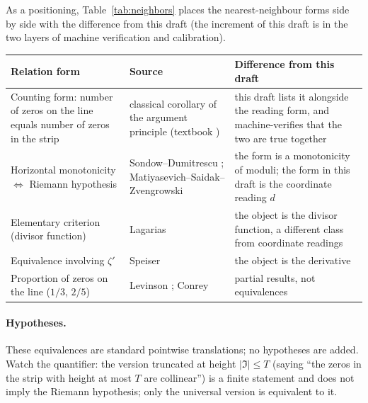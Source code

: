 \documentclass{article}
\renewcommand{\_}{\underscoreOrig\allowbreak}
\newcommand{\zt}{\zeta}
\begin{document}
As a positioning, Table~\ref{tab:neighbors} places the nearest-neighbour
forms side by side with the difference from this draft (the increment of
this draft is in the two layers of machine verification and calibration).

\begin{center}
\begin{tabular}{@{}>{\raggedright\arraybackslash}p{}@{\quad}>{\raggedright\arraybackslash}p{}>{\raggedright\arraybackslash}p{}@{}}
\hline
Relation form & Source & Difference from this draft \\
\hline
Counting form: number of zeros on the line equals number of zeros in the strip & classical corollary of the argument principle (textbook \cite{titchmarsh}) & this draft lists it alongside the reading form, and machine-verifies that the two are true together \\
Horizontal monotonicity $\Leftrightarrow$ Riemann hypothesis & Sondow--Dumitrescu \cite{sondow2010}; Matiyasevich--Saidak--Zvengrowski \cite{msz2014} & the form is a monotonicity of moduli; the form in this draft is the coordinate reading $d$ \\
Elementary criterion (divisor function) & Lagarias \cite{lagarias2002} & the object is the divisor function, a different class from coordinate readings \\
Equivalence involving $\zt'$ & Speiser \cite{speiser} & the object is the derivative \\
Proportion of zeros on the line ($1/3$, $2/5$) & Levinson \cite{levinson1974}; Conrey \cite{conrey1989} & partial results, not equivalences \\
\hline
\end{tabular}
\end{center}
\label{tab:neighbors}
\vspace{6pt}

\paragraph{Hypotheses.} These equivalences are standard pointwise
translations; no hypotheses are added. Watch the quantifier: the version
truncated at height $|\Im|\le T$ (saying ``the zeros in the strip with
height at most $T$ are collinear'') is a finite statement and does not
imply the Riemann hypothesis; only the universal version is equivalent
to it.
\end{document}
